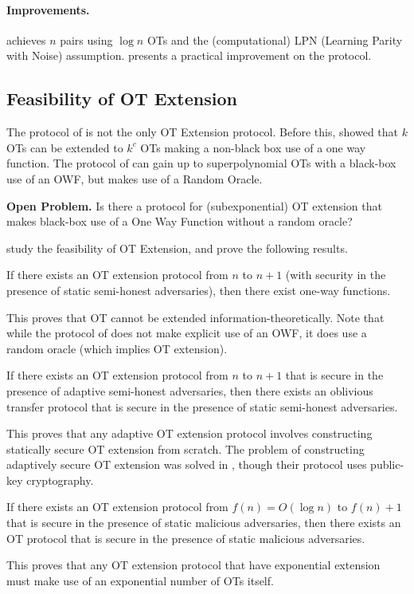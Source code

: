 \paragraph{Improvements.} \cite{vole} achieves $n$ pairs using $\log n$ OTs and the (computational) LPN (Learning Parity with Noise) assumption. \cite{softspokenot} presents a practical improvement on the protocol.

\subsection{Feasibility of OT Extension}

The protocol of \cite{iknp} is not the only OT Extension protocol. Before this, \cite{beaver1996correlated} showed that $k$ OTs can be extended to $k^c$ OTs making a non-black box use of a one way function. The protocol of \cite{iknp} can gain up to superpolynomial OTs with a black-box use of an OWF, but makes use of a Random Oracle.

\textbf{Open Problem.} Is there a protocol for (subexponential) OT extension that makes black-box use of a One Way Function without a random oracle?

\cite{lindell2013feasibility} study the feasibility of OT Extension, and prove the following results.

\begin{theorem}
	If there exists an OT extension protocol from $n$ to $n+1$ (with security in the presence of static semi-honest adversaries), then there exist one-way functions.
\end{theorem}

This proves that OT cannot be extended information-theoretically. Note that while the protocol of \cite{iknp} does not make explicit use of an OWF, it does use a random oracle (which implies OT extension).

\begin{theorem}
	If there exists an OT extension protocol from $n$ to $n+1$ that is secure in the presence of adaptive semi-honest adversaries, then there exists an oblivious transfer protocol that is secure in the presence of static semi-honest adversaries.
\end{theorem}

This proves that any adaptive OT extension protocol involves constructing statically secure OT extension from scratch. The problem of constructing adaptively secure OT extension was solved in \cite{byali2017fast}, though their protocol uses public-key cryptography.

\begin{theorem}
	If there exists an OT extension protocol from $f(n)=O(\log n)$ to $f(n)+1$ that is secure in the presence of static malicious adversaries, then there exists an OT protocol that is secure in the presence of static malicious adversaries.
\end{theorem}

This proves that any OT extension protocol that have exponential extension must make use of an exponential number of OTs itself.